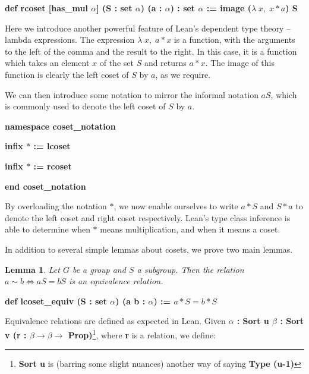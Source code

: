 \documentclass[runningheads,a4paper]{llncs}
\renewcommand{\a}{\alpha}
\renewcommand{\b}{\beta}
\renewcommand{\l}{\lambda}
\renewcommand{\-}{\setminus}
\newtheorem{lemma}[theorem]{Lemma}
\begin{document}
\hspace{2 em}\textbf{def rcoset [has\_mul $\a$] (S : set $\a$) (a : $\a$)  : set $\a$ := image ($\l\; x,\; x * a$) S}
\vspace{2 mm}

Here we introduce another powerful feature of Lean's dependent type theory -- lambda expressions. The expression $\l\; x,\; a * x$ is a function, with the arguments to the left of the comma and the result to the right. In this case, it is a function which takes an element $x$ of the set $S$ and returns $a * x$. The image of this function is clearly the left coset of $S$ by $a$, as we require.

We can then introduce some notation to mirror the informal notation $aS$, which is commonly used to denote the left coset of $S$ by $a$.

\vspace{2 mm}
\hspace{2 em}\textbf{namespace coset\_notation}

\hspace{4 em}\textbf{infix $*$ := lcoset}

\hspace{4 em}\textbf{infix $*$ := rcoset}

\hspace{2 em}\textbf{end coset\_notation}
\vspace{2 mm}

By overloading the notation $*$, we now enable ourselves to write $a * S$ and $S * a$ to denote the left coset and right coset respectively. Lean's type class inference is able to determine when $*$ means multiplication, and when it means a coset.

In addition to several simple lemmas about cosets, we prove two main lemmas.

\begin{lemma}
Let $G$ be a group and $S$ a subgroup. Then the relation $a \sim b \iff aS = bS$ is an equivalence relation.
\end{lemma}

\vspace{2 mm}
\hspace{2 em}\textbf{def lcoset\_equiv (S : set $\a$) (a b : $\a$) := $a * S = b * S$}
\vspace{2 mm}

Equivalence relations are defined as expected in Lean. Given \textbf{{$\a$ : Sort u} {$\b$ : Sort v} (r : $\b \to \b \to$ Prop)}\footnote{\textbf{Sort u} is (barring some slight nuances) another way of saying \textbf{Type (u-1)}}, where \textbf{r} is a relation, we define:
\end{document}
